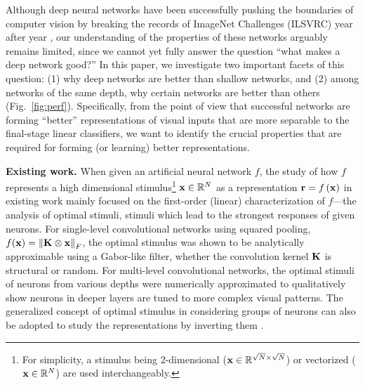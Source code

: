 \documentclass[10pt,twocolumn,letterpaper]{article}
\begin{document}
Although deep neural networks have been successfully pushing the boundaries of computer vision by breaking the records of ImageNet Challenges (ILSVRC) \cite{russakovsky2014imagenet} year after year \cite{krizhevsky2012imagenet, sermanet2013overfeat, szegedy2014going}, our understanding of the properties of these networks arguably remains limited, since we cannot yet fully answer the question ``what makes a deep network good?'' In this paper, we investigate two important facets of this question: (1) why deep networks are better than shallow networks, and (2) among networks of the same depth, why certain networks are better than others (Fig.~\ref{fig:perf}). Specifically, from the point of view that successful networks are forming ``better'' representations of visual inputs that are more separable to the final-stage linear classifiers, we want to identify the crucial properties that are required for forming (or learning) better representations.


\newcommand{\expstimdim}{For simplicity, a stimulus being 2-dimensional (\ie ${\bf{x}} \in \mathbb{R}^{\sqrt{N} \times \sqrt{N}}$) or vectorized (\ie ${\bf{x}} \in \mathbb{R}^N$) are used interchangeably.}

{\bf Existing work.} 
When given an artificial neural network $f$, the study of how $f$ represents a high dimensional stimulus\footnote{\expstimdim} ${\bf{x}} \in \mathbb{R}^N$ as a representation 
${\bf{r}} = f\left( {\bf{x}} \right)$ in existing work mainly focused on the first-order (\ie linear) characterization of $f$---the analysis of optimal stimuli, stimuli which lead to the strongest responses of given neurons.
For single-level convolutional networks using squared pooling, \ie $f({\bf{x}}) = \left\| {\bf{K}} \otimes {\bf{x}} \right\|_{F}$, the optimal stimulus was shown to be analytically approximable \cite{saxe2011random} using a Gabor-like filter, whether the convolution kernel $\bf{K}$ is structural or random.
For multi-level convolutional networks, the optimal stimuli of neurons from various depths were numerically approximated \cite{ngiam2010tiled, le2012building, zeiler2014visualizing, simonyan2013deep} to qualitatively show neurons in deeper layers are tuned to more complex visual patterns.
The generalized concept of optimal stimulus in considering groups of neurons can also be adopted to study the representations by inverting them \cite{mahendran2014understanding}.
\end{document}
